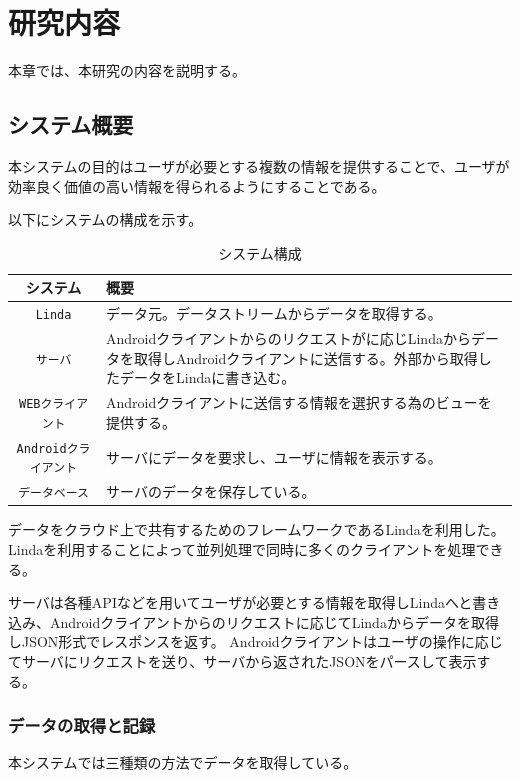 \chapter{研究内容}
\label{chap:contents}

本章では、本研究の内容を説明する。

\section{システム概要}

本システムの目的はユーザが必要とする複数の情報を提供することで、ユーザが効率良く価値の高い情報を得られるようにすることである。

以下にシステムの構成を示す。

\begin{table}[htbp]
  \caption{システム構成}
  \label{tb:files}
  \begin{center}\begin{tabular}{|c|p{12cm}|}
    \hline
    システム&概要\\\hline\hline
    {\tt Linda}\cite{linda}&データ元。データストリームからデータを取得する。\\\hline
    {\tt サーバ}&Androidクライアントからのリクエストがに応じLindaからデータを取得しAndroidクライアントに送信する。外部から取得したデータをLindaに書き込む。\\\hline
    {\tt WEBクライアント}&Androidクライアントに送信する情報を選択する為のビューを提供する。\\\hline
    {\tt Androidクライアント}&サーバにデータを要求し、ユーザに情報を表示する。\\\hline
    {\tt データベース}&サーバのデータを保存している。\\\hline
  \end{tabular}\end{center}
\end{table}

データをクラウド上で共有するためのフレームワークであるLindaを利用した。Lindaを利用することによって並列処理で同時に多くのクライアントを処理できる。

サーバは各種APIなどを用いてユーザが必要とする情報を取得しLindaへと書き込み、Androidクライアントからのリクエストに応じてLindaからデータを取得しJSON形式でレスポンスを返す。
Androidクライアントはユーザの操作に応じてサーバにリクエストを送り、サーバから返されたJSONをパースして表示する。

\subsection{データの取得と記録}
本システムでは三種類の方法でデータを取得している。

